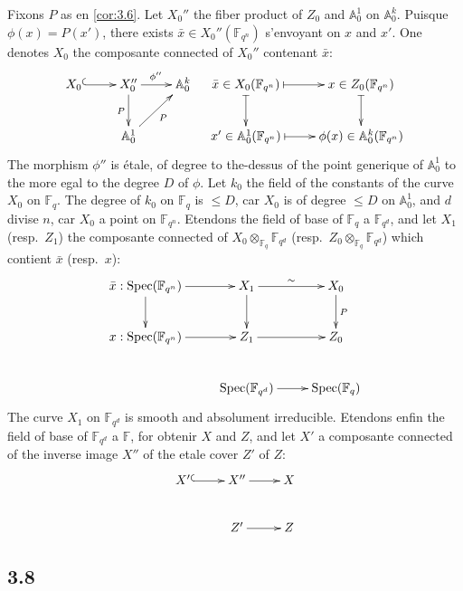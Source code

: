 \documentclass[11pt,a4paper]{article}
\theoremstyle{plain}
\theoremstyle{definition}
\DeclareMathOperator{\Spec}{Spec}
\begin{document}
Fixons $P$ as en \ref{cor:3.6}. Let $X_0''$ the fiber product of $Z_0$ and $\mathbb{A}_0^1$ on $\mathbb{A}_0^k$. Puisque $\phi(x) = P(x')$, there exists $\bar{x} \in X_0''(\mathbb{F}_{q^n})$ s'envoyant on $x$ and $x'$. One denotes $X_0$ the composante connected of $X_0''$ contenant $\bar{x}$:
\begin{equation}\label{eq:3.7.1}
\xymatrix{
X_0 \ar@{^{(}->}[r] & X_0'' \ar[r]^{\phi''} \ar[d]_{P} & \mathbb{A}_0^k \\
& \mathbb{A}_0^1 \ar[ur]_{P} &
}
\quad
\xymatrix{
\bar{x} \in X_0(\mathbb{F}_{q^n}) \ar@{|->}[d] \ar@{|->}[r] & x \in Z_0(\mathbb{F}_{q^n}) \ar@{|->}[d] \\
x' \in \mathbb{A}_0^1(\mathbb{F}_{q^n}) \ar@{|->}[r] & \phi(x) \in \mathbb{A}_0^k(\mathbb{F}_{q^n})
}
\end{equation}
The morphism $\phi''$ is étale, of degree to the-dessus of the point generique of $\mathbb{A}_0^1$ to the more egal to the degree $D$ of $\phi$. Let $k_0$ the field of the constants of the curve $X_0$ on $\mathbb{F}_q$. The degree of $k_0$ on $\mathbb{F}_q$ is $\leq D$, car $X_0$ is of degree $\leq D$ on $\mathbb{A}_0^1$, and $d$ divise $n$, car $X_0$ a point on $\mathbb{F}_{q^n}$. Etendons the field of base of $\mathbb{F}_q$ a $\mathbb{F}_{q^d}$, and let $X_1$ (resp.~$Z_1$) the composante connected of $X_0 \otimes_{\mathbb{F}_q} \mathbb{F}_{q^d}$ (resp.~$Z_0 \otimes_{\mathbb{F}_q} \mathbb{F}_{q^d}$) which contient $\bar{x}$ (resp.~$x$):
\begin{equation}\label{eq:3.7.2}
\xymatrix{
\bar{x}: \Spec(\mathbb{F}_{q^n}) \ar[r] \ar[d] & X_1 \ar[r]^{\sim} \ar[d] & X_0 \ar[d]^{P} \\
x: \Spec(\mathbb{F}_{q^n}) \ar[r] & Z_1 \ar[r] & Z_0 \\
& \Spec(\mathbb{F}_{q^d}) \ar[r] & \Spec(\mathbb{F}_q)
}
\end{equation}
The curve $X_1$ on $\mathbb{F}_{q^d}$ is smooth and absolument irreducible. Etendons enfin the field of base of $\mathbb{F}_{q^d}$ a $\mathbb{F}$, for obtenir $X$ and $Z$, and let $X'$ a composante connected of the inverse image $X''$ of the etale cover $Z'$ of $Z$:
\begin{equation}\label{eq:3.7.3}
\xymatrix{
X' \ar@{^{(}->}[r] & X'' \ar[r] & X \\
& Z' \ar[r] & Z
}
\end{equation}

\subsection{3.8}
\end{document}

